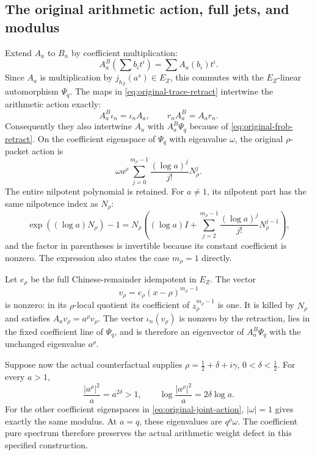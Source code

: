 \subsection{The original arithmetic action, full jets, and modulus}

Extend $A_a$ to $B_n$ by coefficient multiplication:
\[
 A_a^{B}\left(\sum b_it^i\right)=\sum A_a(b_i)t^i.
\]
Since $A_a$ is multiplication by $j_{h_Z}(a^s)\in E_Z$,
this commutes with the $E_Z$-linear automorphism $\Psi_q$.
The maps in \eqref{eq:original-trace-retract} intertwine the
arithmetic action exactly:
\[
 A_a^B\iota_n=\iota_n A_a,\qquad
 r_n A_a^B=A_a r_n.
\]
Consequently they also intertwine $A_a$ with
$A_a^B\Psi_q$ because of \eqref{eq:original-frob-retract}.
On the coefficient eigenspace of $\Psi_q$ with eigenvalue
$\omega$, the original $\rho$-packet action is
\begin{equation}
 \omega a^\rho
 \sum_{j=0}^{m_\rho-1}\frac{(\log a)^j}{j!}N_\rho^j.
 \label{eq:original-joint-action}
\end{equation}
The entire nilpotent polynomial is retained. For $a\ne1$, its
nilpotent part has the same nilpotence index as $N_\rho$:
\[
 \exp((\log a)N_\rho)-1
 =N_\rho\left((\log a)I+
 \sum_{j=2}^{m_\rho-1}\frac{(\log a)^j}{j!}N_\rho^{j-1}\right),
\]
and the factor in parentheses is invertible because its constant
coefficient is nonzero. The expression also states the case
$m_\rho=1$ directly.

Let $e_\rho$ be the full Chinese-remainder idempotent in $E_Z$.
The vector
\[
 v_\rho=e_\rho(x-\rho)^{m_\rho-1}
\]
is nonzero: in its $\rho$-local quotient its coefficient of
$z_\rho^{m_\rho-1}$ is one. It is killed by $N_\rho$ and satisfies
$A_av_\rho=a^\rho v_\rho$. The vector $\iota_n(v_\rho)$ is
nonzero by the retraction, lies in the fixed coefficient line of
$\Psi_q$, and is therefore an eigenvector of $A_a^B\Psi_q$ with
the unchanged eigenvalue $a^\rho$.

Suppose now the actual counterfactual supplies
$\rho=\tfrac12+\delta+i\gamma$, $0<\delta<\tfrac12$.
For every $a>1$,
\begin{equation}
 \frac{|a^\rho|^2}{a}=a^{2\delta}>1,
 \qquad
 \log\frac{|a^\rho|^2}{a}=2\delta\log a.
 \label{eq:original-surviving-defect}
\end{equation}
For the other coefficient eigenspaces in
\eqref{eq:original-joint-action}, $|\omega|=1$ gives exactly the
same modulus. At $a=q$, these eigenvalues are $q^\rho\omega$.
The coefficient pure spectrum therefore preserves the actual
arithmetic weight defect in this specified construction.

